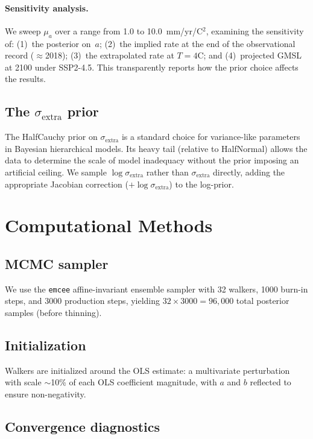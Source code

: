\documentclass[11pt]{article}
\newcommand{\sigextra}{\sigma_{\text{extra}}}
\begin{document}
\paragraph{Sensitivity analysis.}  We sweep $\mu_a$ over a range from 1.0 to 10.0~mm/yr/\textdegree C$^2$, examining the sensitivity of: (1)~the posterior on~$a$; (2)~the implied rate at the end of the observational record ($\approx$2018); (3)~the extrapolated rate at $T = 4$\textdegree C; and (4)~projected GMSL at 2100 under SSP2-4.5.  This transparently reports how the prior choice affects the results.

\subsection{The $\sigextra$ prior}

The HalfCauchy prior on $\sigextra$ is a standard choice for variance-like parameters in Bayesian hierarchical models.  Its heavy tail (relative to HalfNormal) allows the data to determine the scale of model inadequacy without the prior imposing an artificial ceiling.  We sample $\log\sigextra$ rather than $\sigextra$ directly, adding the appropriate Jacobian correction ($+\log\sigextra$) to the log-prior.


\section{Computational Methods}

\subsection{MCMC sampler}

We use the \texttt{emcee} affine-invariant ensemble sampler \citep{foreman-mackey2013emcee} with 32 walkers, 1000 burn-in steps, and 3000 production steps, yielding $32 \times 3000 = 96{,}000$ total posterior samples (before thinning).

\subsection{Initialization}

Walkers are initialized around the OLS estimate: a multivariate perturbation with scale $\sim$10\% of each OLS coefficient magnitude, with $a$ and $b$ reflected to ensure non-negativity.

\subsection{Convergence diagnostics}
\end{document}
